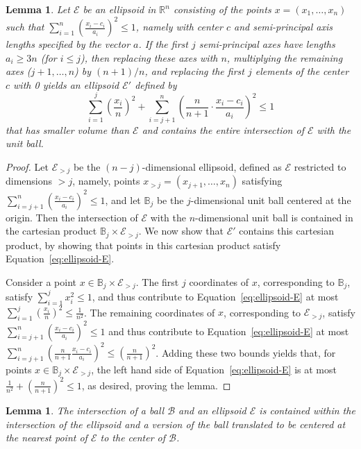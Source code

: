 \documentclass[11pt,letter]{article}
\newcounter{nTheorems}
\numberwithin{nTheorems}{section}
\newtheorem{lemma}[nTheorems]{Lemma}
\begin{document}
\begin{lemma}\label{lem:resizing}
  Let $\mathcal{E}$ be an ellipsoid in $\mathbb{R}^n$ consisting of the points $x=(x_1,\ldots,x_n)$ such that $\sum_{i=1}^n (\frac{x_i-c_i}{a_i})^2\le 1$, namely with center $c$ and semi-principal axis lengths specified by the vector $a$. If the first $j$ semi-principal axes have lengths $a_i\geq 3n$ (for $i\leq j$), then replacing these axes with $n$, multiplying the remaining axes ($j+1,\ldots,n$) by $(n+1)/n$, and replacing the first $j$ elements of the center $c$ with 0 yields an ellipsoid $\mathcal{E}'$ defined by \begin{equation}\label{eq:ellipsoid-E}\sum_{i=1}^j \left(\frac{x_i}{n}\right)^2+\sum_{i=j+1}^n \left(\frac{n}{n+1}\cdot\frac{x_i-c_i}{a_i}\right)^2\le 1\end{equation}
  that has smaller volume than $\mathcal{E}$ and contains the entire intersection of $\mathcal{E}$ with the unit ball.
\end{lemma}
\begin{proof}
  Let $\mathcal{E}_{>j}$ be the $(n-j)$-dimensional ellipsoid, defined as $\mathcal{E}$ restricted to dimensions $>j$, namely, points $x_{>j}=(x_{j+1},\ldots,x_n)$ satisfying $\sum_{i=j+1}^n (\frac{x_i-c_i}{a_i})^2\le 1$, and let $\mathbb{B}_j$ be the $j$-dimensional unit ball centered at the origin. Then the intersection of $\mathcal{E}$ with the $n$-dimensional unit ball is contained in the cartesian product $\mathbb{B}_j\times \mathcal{E}_{>j}$. We now show that $\mathcal{E}'$ contains this cartesian product, by showing that points in this cartesian product satisfy Equation~\ref{eq:ellipsoid-E}.

  Consider a point $x\in \mathbb{B}_j\times \mathcal{E}_{>j}$. The first $j$ coordinates of $x$, corresponding to $\mathbb{B}_j$, satisfy $\sum_{i=1}^j x_i^2\leq 1$, and thus contribute to Equation~\ref{eq:ellipsoid-E} at most $\sum_{i=1}^j (\frac{x_i}{n})^2\leq \frac{1}{n^2}$. The remaining coordinates of $x$, corresponding to $\mathcal{E}_{>j}$, satisfy $\sum_{i=j+1}^n (\frac{x_i-c_i}{a_i})^2\le 1$ and thus contribute to Equation~\ref{eq:ellipsoid-E} at most $\sum_{i=j+1}^n (\frac{n}{n+1}\frac{x_i-c_i}{a_i})^2\le (\frac{n}{n+1})^2$. Adding these two bounds yields that, for points $x\in \mathbb{B}_j\times \mathcal{E}_{>j}$, the left hand side of Equation~\ref{eq:ellipsoid-E} is at most $\frac{1}{n^2}+(\frac{n}{n+1})^2\leq 1$, as desired, proving the lemma.
\end{proof}

\begin{lemma}\label{lem:recentering}
  The intersection of a ball $\mathcal{B}$ and an ellipsoid $\mathcal{E}$ is contained within the intersection of the ellipsoid and a version of the ball translated to be centered at the nearest point of $\mathcal{E}$ to the center of $\mathcal{B}$.
\end{lemma}
\end{document}
